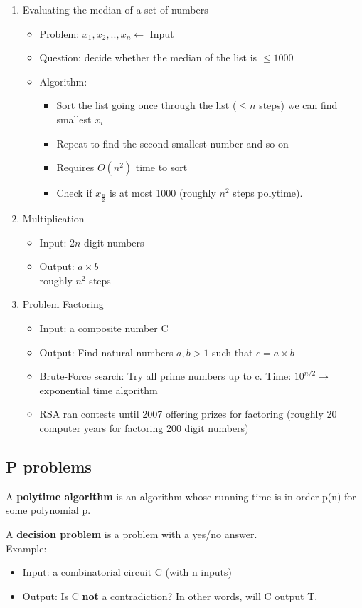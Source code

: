 \documentclass[9pt, letterpaper, oneside]{article}
\begin{document}
\begin{enumerate}
	\item Evaluating the median of a set of numbers
	\begin{itemize}
		\item Problem: $x_1, x_2, .., x_n \leftarrow$ Input
		\item Question: decide whether the median of the list is $\leq 1000$
		\item Algorithm: 
		\begin{itemize}
			\item Sort the list going once through the list ($\leq n$ steps) we can find smallest $x_i$
			\item Repeat to find the second smallest number and so on
			\item Requires $O(n^2)$ time to sort
			\item Check if $x_{\frac{n}{2}}$ is at most 1000 (roughly $n^2$ steps polytime).
		\end{itemize}
	\end{itemize}
	\item Multiplication
		\begin{itemize}
			\item Input: $2 n$ digit numbers
			\item Output: $a \times b$
			\\ roughly $n^2$ steps
		\end{itemize}
	\item Problem Factoring
		\begin{itemize}
			\item Input: a composite number C
			\item Output: Find natural numbers $a, b > 1$ such that $c = a \times b$
			\item Brute-Force search: Try all prime numbers up to c. Time: $10^{n/2} \to$ exponential time algorithm
			\item RSA ran contests until 2007 offering prizes for factoring (roughly 20 computer years for factoring 200 digit numbers)
		\end{itemize}
\end{enumerate}

\subsection{P problems}
A \textbf{polytime algorithm} is an algorithm whose running time is in order p(n) for some polynomial p.

A \textbf{decision problem} is a problem with a yes/no answer.\\
Example: 
	\begin{itemize}
	\item Input: a combinatorial circuit C (with n inputs)
	\item Output: Is C \textbf{not} a contradiction? In other words, will C output T.
	\end{itemize}
\end{document}
